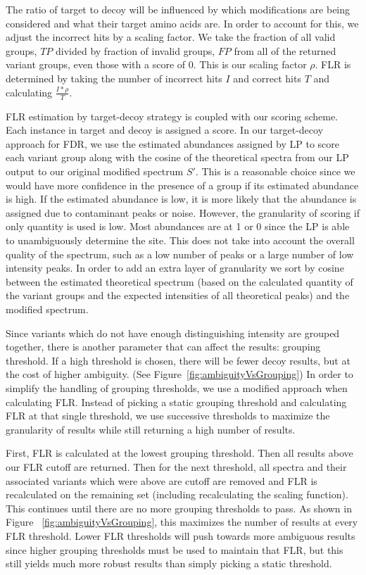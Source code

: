 \documentclass[11pt]{article}
\begin{document}
{The ratio of target to decoy will be influenced by which modifications are being considered and what their target amino acids are. In order to account for this, we adjust the incorrect hits by a scaling factor. We take the fraction of all valid groups, $TP$ divided by fraction of invalid groups, $FP$ from all of the returned variant groups, even those with a score of 0. This is our scaling factor $\rho$. FLR is determined by taking the number of incorrect hits $I$ and correct hits $T$ and calculating $\frac{I*\rho}{T}$.

FLR estimation by target-decoy strategy is coupled with our scoring scheme. Each instance in target and decoy is assigned a score. In our target-decoy approach for FDR, we use the estimated abundances assigned by LP to score each variant group along with the cosine of the theoretical spectra from our LP output to our original modified spectrum $S'$. This is a reasonable choice since we would have more confidence in the presence of a group if its estimated abundance is high. If the estimated abundance is low, it is more likely that the abundance is assigned due to contaminant peaks or noise. However, the granularity of scoring if only quantity is used is low. Most abundances are at 1 or 0 since the LP is able to unambiguously determine the site. This does not take into account the overall quality of the spectrum, such as a low number of peaks or a large number of low intensity peaks. In order to add an extra layer of granularity we sort by cosine between the estimated theoretical spectrum (based on the calculated quantity of the variant groups and the expected intensities of all theoretical peaks) and the modified spectrum. 

Since variants which do not have enough distinguishing intensity are grouped together, there is another parameter that can affect the results: grouping threshold. If a high threshold is chosen, there will be fewer decoy results, but at the cost of higher ambiguity. (See Figure~\ref{fig:ambiguityVsGrouping}) In order to simplify the handling of grouping thresholds, we use a modified approach when calculating FLR. Instead of picking a static grouping threshold and calculating FLR at that single threshold, we use successive thresholds to maximize the granularity of results while still returning a high number of results.

First, FLR is calculated at the lowest grouping threshold. Then all results above our FLR cutoff are returned. Then for the next threshold, all spectra and their associated variants which were above are cutoff are removed and FLR is recalculated on the remaining set (including recalculating the scaling function). This continues until there are no more grouping thresholds to pass. As shown in Figure ~\ref{fig:ambiguityVsGrouping}, this maximizes the number of results at every FLR threshold. Lower FLR thresholds will push towards more ambiguous results since higher grouping thresholds must be used to maintain that FLR, but this still yields much more robust results than simply picking a static threshold. 

}
\end{document}
